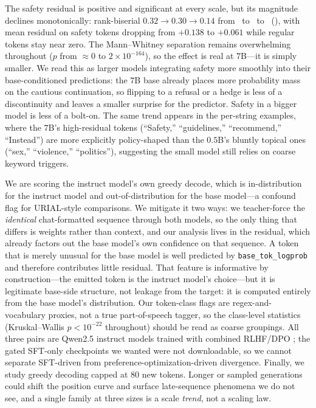  The safety residual is positive and significant at every scale, but its magnitude declines monotonically: rank-biserial $0.32 \to 0.30 \to 0.14$ from \qwensmall\ to \qwenmid\ to \qwenbig\ (), with mean residual on safety tokens dropping from $+0.138$ to $+0.061$ while regular tokens stay near zero. The Mann--Whitney separation remains overwhelming throughout ($p$ from $\approx 0$ to $2\times10^{-164}$), so the effect is real at $7$B---it is simply smaller. We read this as larger models integrating safety more smoothly into their base-conditioned predictions: the $7$B base already places more probability mass on the cautious continuation, so flipping to a refusal or a hedge is less of a discontinuity and leaves a smaller surprise for the predictor. Safety in a bigger model is less of a bolt-on. The same trend appears in the per-string examples, where the $7$B's high-residual tokens (``Safety,'' ``guidelines,'' ``recommend,'' ``Instead'') are more explicitly policy-shaped than the $0.5$B's bluntly topical ones (``sex,'' ``violence,'' ``politics''), suggesting the small model still relies on coarse keyword triggers.

 We are scoring the instruct model's own greedy decode, which is in-distribution for the instruct model and out-of-distribution for the base model---a confound \citet{lin2023urial} flag for URIAL-style comparisons. We mitigate it two ways: we teacher-force the \emph{identical} chat-formatted sequence through both models, so the only thing that differs is weights rather than context, and our analysis lives in the residual, which already factors out the base model's own confidence on that sequence. A token that is merely unusual for the base model is well predicted by \texttt{base\_tok\_logprob} and therefore contributes little residual. That feature is informative by construction---the emitted token is the instruct model's choice---but it is legitimate base-side structure, not leakage from the target: it is computed entirely from the base model's distribution. Our token-class flags are regex-and-vocabulary proxies, not a true part-of-speech tagger, so the class-level statistics (Kruskal--Wallis $p<10^{-22}$ throughout) should be read as coarse groupings. All three pairs are Qwen2.5 instruct models trained with combined RLHF/DPO \citep{ouyang2022instructgpt,rafailov2023dpo}; the gated SFT-only checkpoints we wanted were not downloadable, so we cannot separate SFT-driven from preference-optimization-driven divergence. Finally, we study greedy decoding capped at $80$ new tokens. Longer or sampled generations could shift the position curve and surface late-sequence phenomena we do not see, and a single family at three sizes is a scale \emph{trend}, not a scaling law.

